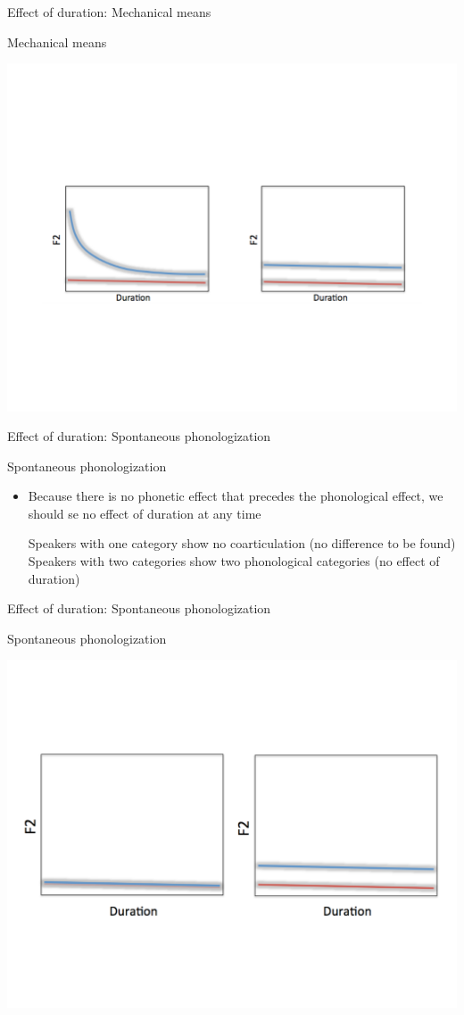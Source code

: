\documentclass[hyperref={pdfpagelabels=false}]{beamer}
\begin{document}
\begin{frame}{Effect of duration: Mechanical means}
	\begin{block}{Mechanical means}
		\begin{center}
		\includegraphics[trim=2cm 2cm 2cm 2cm, clip=false, width=.7\textwidth]{DurationEx.pdf}
		\end{center}
	\end{block}	
\end{frame}

\begin{frame}{Effect of duration: Spontaneous phonologization}
	\begin{block}{Spontaneous phonologization}
		\begin{itemize}
			\item Because there is no phonetic effect that precedes the phonological effect, we should se no effect of duration at any time \pause
			\begin{xlist}
				\ex Speakers with one category show no coarticulation (no difference to be found) \pause
				\ex Speakers with two categories show two phonological categories (no effect of duration) 
			\end{xlist}
		\end{itemize}
	\end{block}	
\end{frame}

\begin{frame}{Effect of duration: Spontaneous phonologization}
	\begin{block}{Spontaneous phonologization}
	\begin{center}
	\includegraphics[trim=2cm 2cm 2cm 2cm, clip=false, width=.7\textwidth]{spontdurex.pdf}
	\end{center}
	\end{block}	
\end{frame}
\end{document}
